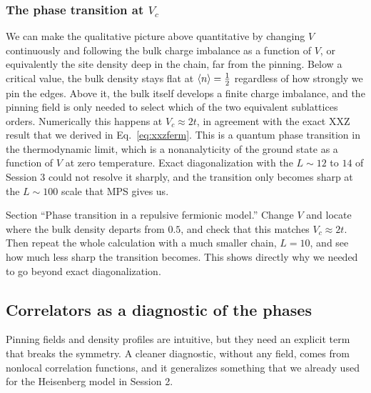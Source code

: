 \documentclass[lecture_notes.tex]{subfiles}
\begin{document}
\subsubsection{The phase transition at $V_c$}
We can make the qualitative picture above quantitative by changing $V$ continuously and following
the bulk charge imbalance as a function of $V$, or equivalently the site density deep in the chain,
far from the pinning. Below a critical value, the bulk density stays flat at
$\expval{n}=\tfrac12$ regardless of how strongly we pin the edges. Above it, the bulk itself
develops a finite charge imbalance, and the pinning field is only needed to select which of the two
equivalent sublattices orders. Numerically this happens at $V_c\approx 2t$, in agreement with the
exact XXZ result that we derived in Eq.~\eqref{eq:xxzferm}. This is a quantum phase transition in
the thermodynamic limit, which is a nonanalyticity of the ground state as a function of $V$ at zero
temperature. Exact diagonalization with the $L\sim12$ to $14$ of Session 3 could not resolve it
sharply, and the transition only becomes sharp at the $L\sim100$ scale that MPS gives us.

\begin{notebook}
Section ``Phase transition in a repulsive fermionic model.'' Change $V$ and locate where the bulk
density departs from $0.5$, and check that this matches $V_c\approx2t$. Then repeat the whole
calculation with a much smaller chain, $L=10$, and see how much less sharp the transition becomes.
This shows directly why we needed to go beyond exact diagonalization.
\end{notebook}

\subsection{Correlators as a diagnostic of the phases}
\label{sec:correlators}
Pinning fields and density profiles are intuitive, but they need an explicit term that breaks the
symmetry. A cleaner diagnostic, without any field, comes from nonlocal correlation functions, and
it generalizes something that we already used for the Heisenberg model in Session 2.
\end{document}
